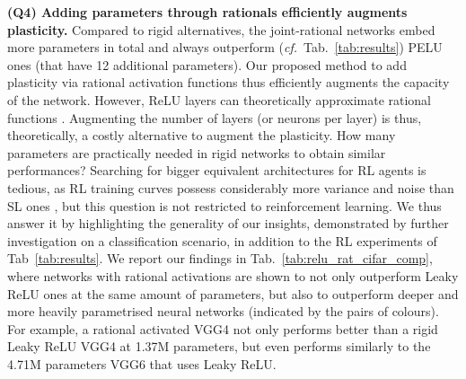 \documentclass[accepted]{article}
\theoremstyle{plain}
\theoremstyle{definition}
\theoremstyle{remark}
\newcommand{\cf}{\emph{cf.}~}
\begin{document}
\textbf{(Q4) Adding parameters through rationals efficiently augments plasticity.}
Compared to rigid alternatives, the joint-rational networks embed  more parameters in total and always outperform (\cf Tab.~\ref{tab:results}) PELU ones (that have 12 additional parameters). Our proposed method to add plasticity via rational activation functions thus efficiently augments the capacity of the network. However, ReLU layers can theoretically approximate rational functions \cite{telgarsky2017neural}. Augmenting the number of layers (or neurons per layer) is thus, theoretically, a costly alternative to augment the plasticity. How many parameters are practically needed in rigid networks to obtain similar performances? Searching for bigger equivalent architectures for RL agents is tedious, as RL training curves possess considerably more variance and noise than SL ones \cite{miao2021rldarts}, but this question is not restricted to reinforcement learning. We thus answer it by highlighting the generality of our insights, demonstrated by further investigation on a classification scenario, in addition to the RL experiments of Tab~\ref{tab:results}. We report our findings in Tab.~\ref{tab:relu_rat_cifar_comp}, where networks with rational activations are shown to not only outperform Leaky ReLU ones at the same amount of parameters, but also to outperform deeper and more heavily parametrised neural networks (indicated by the pairs of colours). For example, a rational activated VGG4 not only performs better than a rigid Leaky ReLU VGG4 at 1.37M parameters, but even performs similarly to the 4.71M parameters VGG6 that uses Leaky ReLU.
\end{document}
